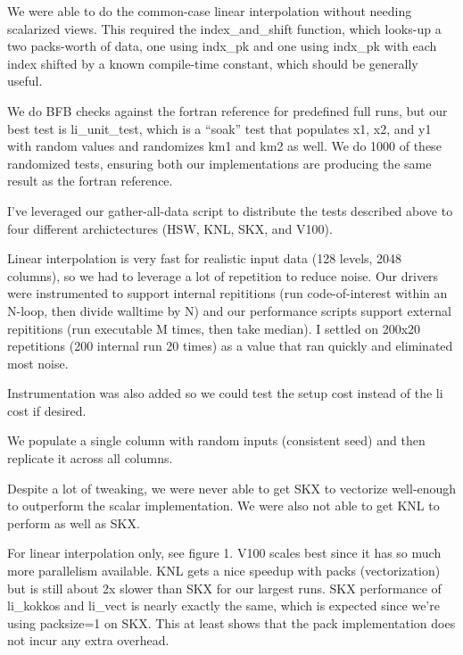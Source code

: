 \documentclass[10pt,twocolumn]{article}
\begin{document}
\twocolumn

We were able to do the common-case linear interpolation without needing scalarized
views. This required the index\_and\_shift function, which looks-up a two packs-worth
of data, one using indx\_pk and one using indx\_pk with each index shifted by a known
compile-time constant, which should be generally useful.


We do BFB checks against the fortran reference for predefined full runs, but our best test is
li\_unit\_test, which is a ``soak'' test that populates x1, x2, and y1 with random
values and randomizes km1 and km2 as well. We do 1000 of these randomized tests,
ensuring both our implementations are producing the same result as the fortran reference.

I've leveraged our gather-all-data script to distribute the tests described above to four different
archictectures (HSW, KNL, SKX, and V100).


Linear interpolation is very fast for realistic input data (128 levels, 2048 columns), so we
had to leverage a lot of repetition to reduce noise. Our drivers were instrumented to support
internal repititions (run code-of-interest within an N-loop, then divide walltime by N) and our performance scripts
support external repititions (run executable M times, then take median). I settled on
200x20 repetitions (200 internal run 20 times) as a value that ran quickly and eliminated
most noise.

Instrumentation was also added so we could test the setup cost instead of the li cost
if desired.

We populate a single column with random inputs (consistent seed) and then replicate it
across all columns.


Despite a lot of tweaking, we were never able to get SKX to vectorize well-enough to outperform
the scalar implementation. We were also not able to get KNL to perform as well as SKX.

For linear interpolation only, see figure 1. V100 scales best since it has so much more parallelism
available. KNL gets a nice speedup with packs (vectorization) but is still about 2x slower than SKX
for our largest runs. SKX performance of li\_kokkos and li\_vect is nearly exactly the same, which is
expected since we're using packsize=1 on SKX. This at least shows that the pack implementation does not incur
any extra overhead.
\end{document}
